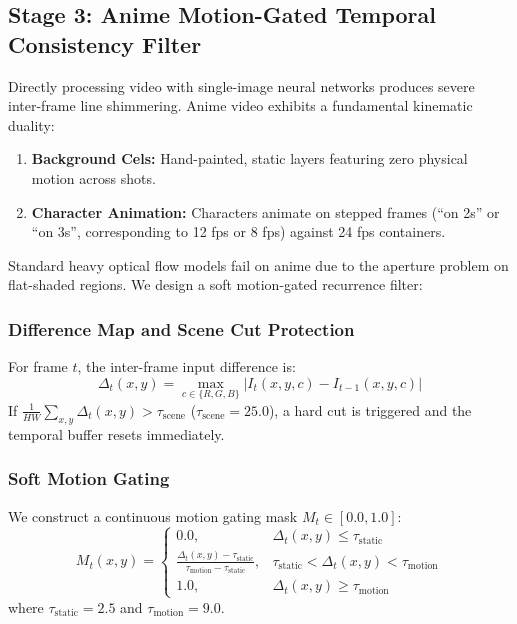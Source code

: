 \documentclass[conference]{IEEEtran}
\begin{document}
\subsection{Stage 3: Anime Motion-Gated Temporal Consistency Filter}
Directly processing video with single-image neural networks produces severe inter-frame line shimmering. Anime video exhibits a fundamental kinematic duality:
\begin{enumerate}
    \item \textbf{Background Cels:} Hand-painted, static layers featuring zero physical motion across shots.
    \item \textbf{Character Animation:} Characters animate on stepped frames (``on 2s'' or ``on 3s'', corresponding to 12 fps or 8 fps) against 24 fps containers.
\end{enumerate}

Standard heavy optical flow models fail on anime due to the aperture problem on flat-shaded regions. We design a soft motion-gated recurrence filter:

\subsubsection{Difference Map and Scene Cut Protection}
For frame $t$, the inter-frame input difference is:
\begin{equation}
\Delta_t(x, y) = \max_{c \in \{R,G,B\}} |I_t(x, y, c) - I_{t-1}(x, y, c)|
\end{equation}
If $\frac{1}{HW}\sum_{x,y} \Delta_t(x,y) > \tau_{\text{scene}}$ ($\tau_{\text{scene}} = 25.0$), a hard cut is triggered and the temporal buffer resets immediately.

\subsubsection{Soft Motion Gating}
We construct a continuous motion gating mask $M_t \in [0.0, 1.0]$:
\begin{equation}
M_t(x, y) = \begin{cases} 
0.0, & \Delta_t(x, y) \le \tau_{\text{static}} \\
\frac{\Delta_t(x, y) - \tau_{\text{static}}}{\tau_{\text{motion}} - \tau_{\text{static}}}, & \tau_{\text{static}} < \Delta_t(x, y) < \tau_{\text{motion}} \\
1.0, & \Delta_t(x, y) \ge \tau_{\text{motion}}
\end{cases}
\end{equation}
where $\tau_{\text{static}} = 2.5$ and $\tau_{\text{motion}} = 9.0$.
\end{document}
